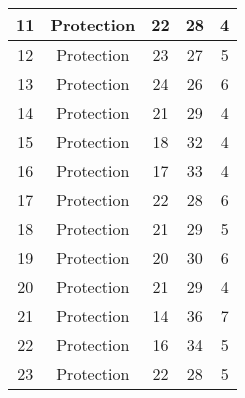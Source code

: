 \documentclass[results.tex]{subfiles}
\begin{document}
\begin{center}
\begin{tabular}{| c || c | c | c | c |}
            \hline
            11                      & Protection                   & 22                     & 28                      & 4                    \\
            \hline
            12                      & Protection                   & 23                     & 27                      & 5                    \\
            \hline
            13                      & Protection                   & 24                     & 26                      & 6                    \\
            \hline
            14                      & Protection                   & 21                     & 29                      & 4                    \\
            \hline
            15                      & Protection                   & 18                     & 32                      & 4                    \\
            \hline
            16                      & Protection                   & 17                     & 33                      & 4                    \\
            \hline
            17                      & Protection                   & 22                     & 28                      & 6                    \\
            \hline
            18                      & Protection                   & 21                     & 29                      & 5                    \\
            \hline
            19                      & Protection                   & 20                     & 30                      & 6                    \\
            \hline
            20                      & Protection                   & 21                     & 29                      & 4                    \\
            \hline
            21                      & Protection                   & 14                     & 36                      & 7                    \\
            \hline
            22                      & Protection                   & 16                     & 34                      & 5                    \\
            \hline
            23                      & Protection                   & 22                     & 28                      & 5                    \\

\end{tabular}
\end{center}
\end{document}
